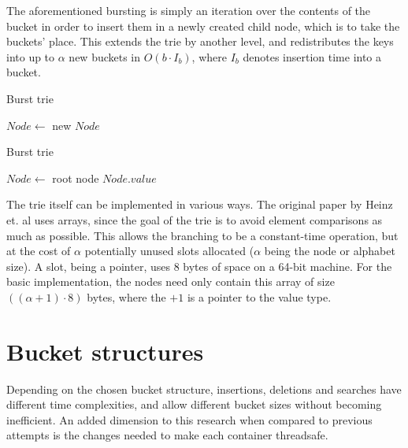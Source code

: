 The aforementioned bursting is simply an iteration over the contents of the
bucket in order to insert them in a newly created child node, which is to
take the buckets' place. This extends the trie by another level, and redistributes
the keys into up to $\alpha$ new buckets in $O(b \cdot I_b)$, where $I_b$ denotes
insertion time into a bucket.

\begin{algorithm}[H]
    \caption{Burst trie }
    \label{alg:bt_burst}
    $Node \leftarrow$ new $Node$\;
\end{algorithm}

\begin{algorithm}[H]
    \caption{Burst trie }
    \label{alg:bt_search}

    $Node \leftarrow$  root node\;
    \Return $Node.value$\;
\end{algorithm}

The trie itself can be implemented in various ways. The original paper by Heinz
et. al \cite{Heinz:2002} uses arrays, since the goal of the trie is to avoid
element comparisons as much as possible. This allows the branching to be a
constant-time operation, but at the cost of $\alpha$ potentially unused slots
allocated ($\alpha$ being the node or alphabet size). A slot, being a pointer,
uses 8 bytes of space on a 64-bit machine.
For the basic implementation, the nodes need only contain this array of size
$((\alpha+1) \cdot 8)$ bytes, where the $+1$ is a pointer to the value type.


\section{Bucket structures}
Depending on the chosen bucket structure, insertions, deletions and searches
have different time complexities, and allow different bucket sizes without
becoming inefficient. An added dimension to this research when compared to
previous attempts is the changes needed to make each container threadsafe.

